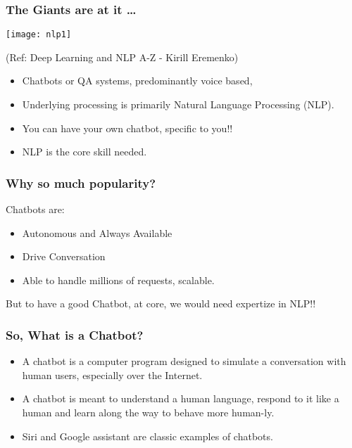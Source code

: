 \begin{frame}[fragile]\frametitle{The Giants are at it \ldots}
\begin{center}
\texttt{[image: nlp1]}

\tiny{(Ref: Deep Learning and NLP A-Z - Kirill Eremenko)}
\end{center}

	\begin{itemize}
	\item Chatbots or QA systems, predominantly voice based, 
	\item Underlying processing is primarily Natural Language Processing (NLP).
	\item You can have your own chatbot, specific to you!! 
	\item NLP is the core skill needed.
	\end{itemize}
	
\end{frame}


\begin{frame}[fragile]\frametitle{Why so much popularity?}
Chatbots are:
	\begin{itemize}
	\item Autonomous and Always Available
	\item Drive Conversation
	\item Able to handle millions of requests, scalable.
	\end{itemize}
	
But to have a good Chatbot, at core, we would need expertize in NLP!!

\end{frame}


\begin{frame}[fragile]\frametitle{So, What is a Chatbot?}

\begin{itemize}
\item A chatbot is a computer program designed to simulate a conversation with human users, especially over the Internet.
\item A chatbot is meant to understand a human language, respond to it like a human and learn along the way to behave more human-ly.
\item Siri and Google assistant are classic examples of chatbots.
\end{itemize}

\end{frame}

